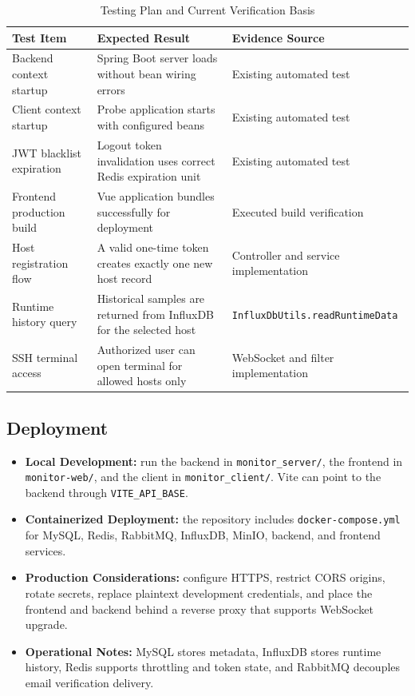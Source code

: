 \documentclass[11pt,a4paper]{article}
\begin{document}
\begin{table}[H]
  \centering
  \begin{tabularx}{\linewidth}{>{\raggedright\arraybackslash}p{4.2cm} >{\raggedright\arraybackslash}X >{\raggedright\arraybackslash}p{2.5cm}}
    \toprule
    \textbf{Test Item} & \textbf{Expected Result} & \textbf{Evidence Source} \\
    \midrule
    Backend context startup & Spring Boot server loads without bean wiring errors & Existing automated test \\
    Client context startup & Probe application starts with configured beans & Existing automated test \\
    JWT blacklist expiration & Logout token invalidation uses correct Redis expiration unit & Existing automated test \\
    Frontend production build & Vue application bundles successfully for deployment & Executed build verification \\
    Host registration flow & A valid one-time token creates exactly one new host record & Controller and service implementation \\
    Runtime history query & Historical samples are returned from InfluxDB for the selected host & \texttt{InfluxDbUtils.readRuntimeData} \\
    SSH terminal access & Authorized user can open terminal for allowed hosts only & WebSocket and filter implementation \\
    \bottomrule
  \end{tabularx}
  \caption{Testing Plan and Current Verification Basis}
\end{table}

\subsection{Deployment}

\begin{itemize}
  \item \textbf{Local Development:} run the backend in \texttt{monitor\_server/}, the frontend in \texttt{monitor-web/}, and the client in \texttt{monitor\_client/}. Vite can point to the backend through \texttt{VITE\_API\_BASE}.
  \item \textbf{Containerized Deployment:} the repository includes \texttt{docker-compose.yml} for MySQL, Redis, RabbitMQ, InfluxDB, MinIO, backend, and frontend services.
  \item \textbf{Production Considerations:} configure HTTPS, restrict CORS origins, rotate secrets, replace plaintext development credentials, and place the frontend and backend behind a reverse proxy that supports WebSocket upgrade.
  \item \textbf{Operational Notes:} MySQL stores metadata, InfluxDB stores runtime history, Redis supports throttling and token state, and RabbitMQ decouples email verification delivery.
\end{itemize}
\end{document}
